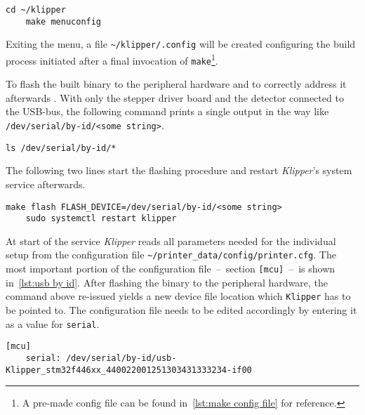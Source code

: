         \begin{lstlisting}[style=mybash, numbers=none]
    cd ~/klipper
    make menuconfig
        \end{lstlisting}

        Exiting the menu, a file \texttt{\textasciitilde/klipper/.config} will be created configuring the build process initiated after a final invocation of \texttt{make}\footnote{A pre-made config file can be found in~\cref{lst:make config file} for reference.}.\par\medskip

        To flash the built binary to the peripheral hardware and to correctly address it afterwards . With only the stepper driver board and the detector connected to the USB-bus, the following command prints a single output in the way like \texttt{/dev/serial/by-id/<some string>}.

        \begin{lstlisting}[style=mybash, numbers=none]
    ls /dev/serial/by-id/*
        \end{lstlisting}
        
        The following two lines start the flashing procedure and restart \textit{Klipper}'s system service afterwards.
        
        \begin{lstlisting}[style=mybash, numbers=none]
    make flash FLASH_DEVICE=/dev/serial/by-id/<some string>
    sudo systemctl restart klipper
        \end{lstlisting}

        At start of the service \textit{Klipper} reads all parameters needed for the individual setup from the configuration file \texttt{\textasciitilde/printer\_data/config/printer.cfg}.
        The most important portion of the configuration file~--~section \texttt{[mcu]}~--~is shown in~\cref{lst:usb by id}.
        After flashing the binary to the peripheral hardware, the command above re-issued yields a new device file location which \texttt{Klipper} has to be pointed to.
        The configuration file needs to be edited accordingly by entering it as a value for \texttt{serial}.

        \begin{lstlisting}[style=mydjango, firstnumber=7,
            caption={[\texttt{mcu}-section of \texttt{printer.cfg} showing the id of the connected serial device]\texttt{mcu}-section of the \texttt{printer.cfg} showing the id of the connected serial device.},
            label={lst:usb by id}%
            ]
    [mcu]
    serial: /dev/serial/by-id/usb-Klipper_stm32f446xx_440022001251303431333234-if00
        \end{lstlisting}

